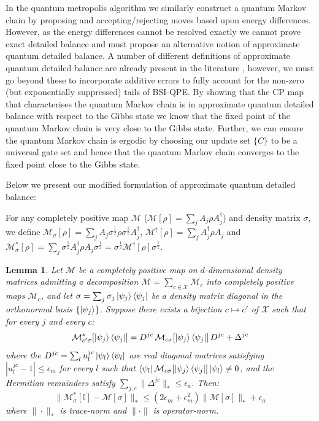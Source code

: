 \documentclass[aps,floatfix,10pt,amssymb,amsfont,amsmath,superscriptaddress,float,nofootinbib,longbibliography,nobalancelastpage,twocolumn]{revtex4-2}
\newtheorem{lemma}{Lemma}
\begin{document}
In the quantum metropolis algorithm we similarly construct a quantum Markov chain by proposing and accepting/rejecting moves based upon energy differences. However, as the energy differences cannot be resolved exactly we cannot prove exact detailed balance and must propose an alternative notion of approximate quantum detailed balance. A number of different definitions of approximate quantum detailed balance are already present in the literature \cite{}, however, we must go beyond these to incorporate additive errors to fully account for the non-zero (but exponentially suppressed) tails of BSI-QPE. By showing that the CP map that characterises the quantum Markov chain is in approximate quantum detailed balance with respect to the Gibbs state we know that the fixed point of the quantum Markov chain is very close to the Gibbs state. Further, we can ensure the quantum Markov chain is ergodic by choosing our update set $\{C\}$ to be a universal gate set \cite{Temme_2011} and hence that the quantum Markov chain converges to the fixed point close to the Gibbs state.

Below we present our modified formulation of approximate quantum detailed balance:

For any completely positive map $\mathcal{M}$ ($\mathcal{M}[\rho] =\sum_{j}  A_{j}\rho  A^{\dagger}_{j}$) and density matrix $\sigma$, we define $\mathcal{M}_{\sigma}[\rho] =\sum_{j}  A_{j}\sigma^{\frac{1}{2}}\rho\sigma^{\frac{1}{2}}  A^{\dagger}_{j}$, $\mathcal{M}^{\dagger}[\rho] = \sum_j A^{\dagger}_j \rho A_j$ and $ \mathcal{M}^*_{\sigma}[\rho] = \sum_{j} \sigma^{\frac{1}{2}}A^{\dagger}_{j}\rho A_{j}\sigma^{\frac{1}{2}} = \sigma^{\frac{1}{2}}\mathcal{M}^{\dagger}[\rho]\sigma^{\frac{1}{2}}$.
\begin{lemma}
\label{lemma:1}
Let $\mathcal{M}$ be a completely positive map on $d$-dimensional density matrices admitting a decomposition $\mathcal{M} = \sum_{c\in\mathcal{X}} \mathcal{M}_c$ into completely positive maps $\mathcal{M}_c$, and let $\sigma = \sum_j \sigma_j \ket{\psi_j}\bra{\psi_j}$ be a density matrix diagonal in the orthonormal basis $\{\ket{\psi_j}\}$. Suppose there exists a bijection $c \mapsto c'$ of $\mathcal{X}$ such that for every $j$ and every $c$:
\begin{equation}
    \mathcal{M}^*_{c'\sigma}[\ket{\psi_j}\bra{\psi_j}] = D^{jc}\,\mathcal{M}_{c\sigma}[\ket{\psi_j}\bra{\psi_j}]\,D^{jc} + \Delta^{jc}
    \label{eq:approximate_quantum_detailed_balance_condition}
\end{equation}
where the $D^{jc} = \sum_l u^{jc}_l\ket{\psi_l}\bra{\psi_l}$ are real diagonal matrices satisfying $|u^{jc}_l - 1| \leq \epsilon_m$ for every $l$ such that $\bra{\psi_l}\mathcal{M}_{c\sigma}[\ket{\psi_j}\bra{\psi_j}]\ket{\psi_l} \neq 0$, and the Hermitian remainders satisfy $\sum_{j,c}\|\Delta^{jc}\|_* \leq \epsilon_a$. Then:
 \begin{equation}
    \|\mathcal{M}^*_{\sigma}[\mathbb{I}]-\mathcal{M}[\sigma] \|_* \leq (2\epsilon_m+\epsilon_m^2)\|\mathcal{M}[\sigma]\|_* + \epsilon_a
\end{equation}
where $\|\cdot\|_*$ is trace-norm and $\|\cdot\|$ is operator-norm.
\end{lemma}
\end{document}
